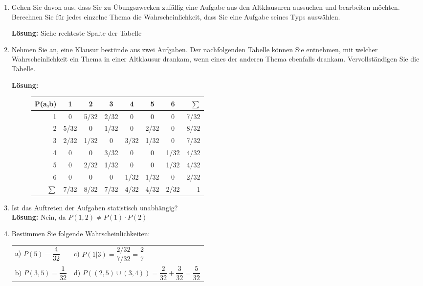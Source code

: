 \documentclass[11pt, a4paper]{article}
\begin{document}
\begin{enumerate}
\item Gehen Sie davon aus, dass Sie zu Übungszwecken zufällig eine Aufgabe aus den Altklausuren aussuchen und bearbeiten möchten. Berechnen Sie für jedes einzelne Thema die Wahrscheinlichkeit, dass Sie eine Aufgabe seines Typs auswählen.

\textbf{Lösung:} Siehe rechteste Spalte der Tabelle
\item Nehmen Sie an, eine Klausur bestünde aus zwei Aufgaben. Der nachfolgenden Tabelle können Sie entnehmen, mit welcher Wahrscheinlichkeit ein Thema in einer Altklausur drankam, wenn eines der anderen Thema ebenfalls drankam. Vervollständigen Sie die Tabelle.

\textbf{Lösung:}
\begin{figure}[h!]
\centering
\setlength\extrarowheight{5pt}
\begin{tabular}{r|cccccc|r}
	P(a,b)	& 1 	& 2 	& 3 	& 4 	& 5 	& 6 	& $\sum$\\ \hline
	1 		& 0 	& 5/32 	& 2/32 	& 0  	& 0  	& 0 	& 7/32 \\
	2 		& 5/32	& 0		& 1/32 	& 0 	& 2/32 	& 0 	& 8/32 \\
	3 		& 2/32	& 1/32 	& 0 	& 3/32 	& 1/32 	& 0  	& 7/32 \\
	4 		& 0		& 0 	& 3/32 	& 0 	& 0  	& 1/32 	& 4/32 \\
	5 		& 0  	& 2/32 	& 1/32 	& 0 	& 0  	& 1/32 	& 4/32 \\
	6 		& 0 	& 0 	& 0  	& 1/32 	& 1/32 	& 0 	& 2/32 \\ \hline
	$\sum$ 	& 7/32 	& 8/32 	& 7/32 	& 4/32 	& 4/32 	& 2/32  & 1\\
\end{tabular}
\end{figure}

\item Ist das Auftreten der Aufgaben statistisch unabhängig?\\
\textbf{Lösung:} Nein, da $P(1, 2) \neq P(1) \cdot P(2)$
\item Bestimmen Sie folgende Wahrscheinlichkeiten:

	\begin{tabular}{ll}
	a) $P(5) = \dfrac{4}{32}$ \hspace{4cm} 				& c) $P(1|3) = \dfrac{2/32}{7/32} = \dfrac{2}{7}$ \\
	b) $P(3, 5) = \dfrac{1}{32}$ 					& d) $P((2, 5) \cup (3, 4)) = \dfrac{2}{32} + \dfrac{3}{32} = \dfrac{5}{32}$
	\end{tabular}

\end{enumerate}
\end{document}
